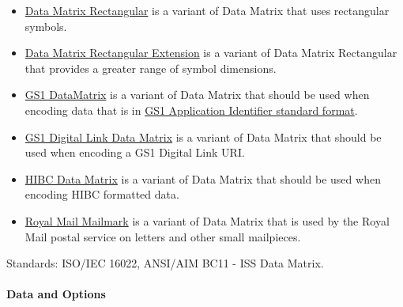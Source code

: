 \begin{itemize}
\tightlist
\item
  \protect\hyperlink{data-matrix-rectangular}{Data Matrix Rectangular}
  is a variant of Data Matrix that uses rectangular symbols.
\item
  \protect\hyperlink{data-matrix-rectangular-extension}{Data Matrix
  Rectangular Extension} is a variant of Data Matrix Rectangular that
  provides a greater range of symbol dimensions.
\item
  \protect\hyperlink{gs1-datamatrix}{GS1 DataMatrix} is a variant of
  Data Matrix that should be used when encoding data that is in
  \protect\hyperlink{gs1-application-identifier-standard-format}{GS1
  Application Identifier standard format}.
\item
  \protect\hyperlink{gs1-digital-link-data-matrix}{GS1 Digital Link Data
  Matrix} is a variant of Data Matrix that should be used when encoding
  a GS1 Digital Link URI.
\item
  \protect\hyperlink{hibc-symbols}{HIBC Data Matrix} is a variant of
  Data Matrix that should be used when encoding HIBC formatted data.
\item
  \protect\hyperlink{mailmark}{Royal Mail Mailmark} is a variant of Data
  Matrix that is used by the Royal Mail postal service on letters and
  other small mailpieces.
\end{itemize}

Standards: ISO/IEC 16022, ANSI/AIM BC11 - ISS Data Matrix.

\hypertarget{data-and-options-9}{%
\paragraph{Data and Options}\label{data-and-options-9}}

